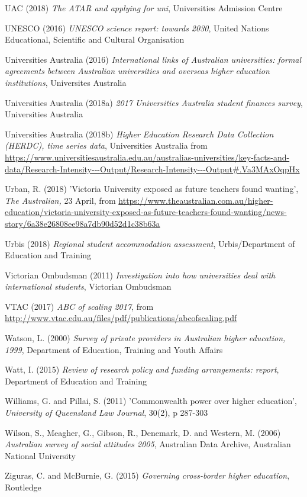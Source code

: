 \documentclass[]{book}
\begin{document}
UAC (2018) \emph{The ATAR and applying for uni}, Universities Admission Centre

UNESCO (2016) \emph{UNESCO science report: towards 2030}, United Nations Educational, Scientific and Cultural Organisation

Universities Australia (2016) \emph{International links of Australian universities: formal agreements between Australian universities and overseas higher education institutions}, Universites Australia

Universities Australia (2018a) \emph{2017 Universities Australia student finances survey}, Universities Australia

\protect\hypertarget{_ENREF_209}{}{}Universities Australia (2018b) \emph{Higher Education Research Data Collection (HERDC), time series data}, Universities Australia from \url{https://www.universitiesaustralia.edu.au/australias-universities/key-facts-and-data/Research-Intensity---Output/Research-Intensity---Output\#.Va3MAxOqpHx}

Urban, R. (2018) 'Victoria University exposed as future teachers found wanting', \emph{The Australian,} 23 April, from \url{https://www.theaustralian.com.au/higher-education/victoria-university-exposed-as-future-teachers-found-wanting/news-story/6a38e26808ee98a7db90d52d1c38b63a}

Urbis (2018) \emph{Regional student accommodation assessment}, Urbis/Department of Education and Training

Victorian Ombudsman (2011) \emph{Investigation into how universities deal with international students}, Victorian Ombudsman

VTAC (2017) \emph{ABC of scaling 2017}, from \url{http://www.vtac.edu.au/files/pdf/publications/abcofscaling.pdf}

Watson, L. (2000) \emph{Survey of private providers in Australian higher education, 1999}, Department of Education, Training and Youth Affairs

Watt, I. (2015) \emph{Review of research policy and funding arrangements: report}, Department of Education and Training

Williams, G. and Pillai, S. (2011) 'Commonwealth power over higher education', \emph{University of Queensland Law Journal}, 30(2), p 287-303

\protect\hypertarget{_ENREF_217}{}{}Wilson, S., Meagher, G., Gibson, R., Denemark, D. and Western, M. (2006) \emph{Australian survey of social attitudes 2005}, Australian Data Archive, Australian National University

Ziguras, C. and McBurnie, G. (2015) \emph{Governing cross-border higher education}, Routledge
\end{document}
